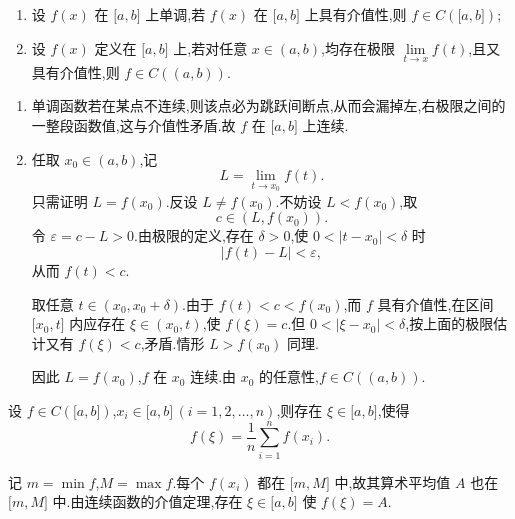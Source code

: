 \begin{example}
    \begin{enumerate}
        \item 设 $f(x)$ 在 $\lbrack a,b\rbrack$ 上单调,若 $f(x)$ 在 $\lbrack a,b\rbrack$ 上具有介值性,则 $f\in C(\lbrack a,b\rbrack)$;
        \item 设 $f(x)$ 定义在 $\lbrack a,b\rbrack$ 上,若对任意 $x\in(a,b)$,均存在极限 $\displaystyle\lim\limits_{t\to x}f(t)$,且又具有介值性,则 $f\in C((a,b))$.
    \end{enumerate}
\end{example}
\exampleblank

\begin{solution}
    \leavevmode
    \begin{enumerate}
        \item 单调函数若在某点不连续,则该点必为跳跃间断点,从而会漏掉左,右极限之间的一整段函数值,这与介值性矛盾.故 $f$ 在 $\lbrack a,b\rbrack$ 上连续.

        \item 任取 $x_0\in(a,b)$,记
              \[
                  L=\lim\limits_{t\to x_0}f(t).
              \]
              只需证明 $L=f(x_0)$.反设 $L\neq f(x_0)$.不妨设 $L<f(x_0)$,取
              \[
                  c\in(L,f(x_0)).
              \]
              令 $\varepsilon=c-L>0$.由极限的定义,存在 $\delta>0$,使 $0<|t-x_0|<\delta$ 时
              \[
                  |f(t)-L|<\varepsilon,
              \]
              从而 $f(t)<c$.

              取任意 $t\in(x_0,x_0+\delta)$.由于 $f(t)<c<f(x_0)$,而 $f$ 具有介值性,在区间 $\lbrack x_0,t\rbrack$ 内应存在 $\xi\in(x_0,t)$,使 $f(\xi)=c$.但 $0<|\xi-x_0|<\delta$,按上面的极限估计又有 $f(\xi)<c$,矛盾.情形 $L>f(x_0)$ 同理.

              因此 $L=f(x_0)$,$f$ 在 $x_0$ 连续.由 $x_0$ 的任意性,$f\in C((a,b))$.
    \end{enumerate}
\end{solution}

\begin{example}
    设 $f\in C(\lbrack a,b\rbrack)$,$x_i\in\lbrack a,b\rbrack\,(i=1,2,\ldots,n)$,则存在 $\xi\in\lbrack a,b\rbrack$,使得
    \[
        f(\xi)=\dfrac{1}{n}\sum\limits_{i=1}^n f(x_i).
    \]
\end{example}
\exampleblank

\begin{solution}
    记 $m=\min f$,$M=\max f$.每个 $f(x_i)$ 都在 $\lbrack m,M\rbrack$ 中,故其算术平均值 $A$ 也在 $\lbrack m,M\rbrack$ 中.由连续函数的介值定理,存在 $\xi\in\lbrack a,b\rbrack$ 使 $f(\xi)=A$.
\end{solution}

